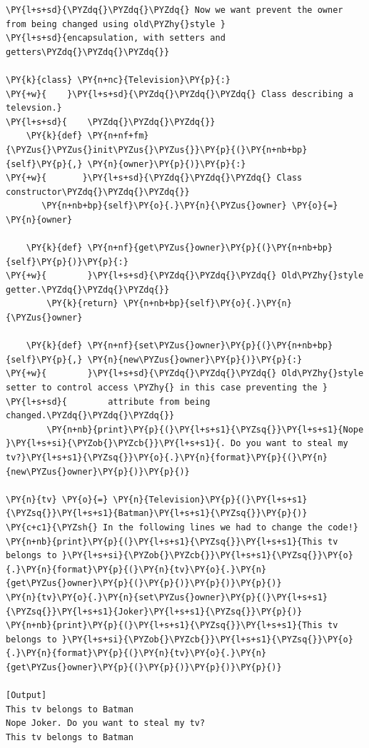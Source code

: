 \begin{Verbatim}[label=\makebox{\url{https://github.com/lucabaldini/cmepda/tree/master/slides/latex/snippets/class\_tv\_encapsulation\_old.py}},commandchars=\\\{\}]
\PY{l+s+sd}{\PYZdq{}\PYZdq{}\PYZdq{} Now we want prevent the owner from being changed using old\PYZhy{}style }
\PY{l+s+sd}{encapsulation, with setters and getters\PYZdq{}\PYZdq{}\PYZdq{}}

\PY{k}{class} \PY{n+nc}{Television}\PY{p}{:}
\PY{+w}{    }\PY{l+s+sd}{\PYZdq{}\PYZdq{}\PYZdq{} Class describing a televsion.}
\PY{l+s+sd}{    \PYZdq{}\PYZdq{}\PYZdq{}}
    \PY{k}{def} \PY{n+nf+fm}{\PYZus{}\PYZus{}init\PYZus{}\PYZus{}}\PY{p}{(}\PY{n+nb+bp}{self}\PY{p}{,} \PY{n}{owner}\PY{p}{)}\PY{p}{:}
\PY{+w}{       }\PY{l+s+sd}{\PYZdq{}\PYZdq{}\PYZdq{} Class constructor\PYZdq{}\PYZdq{}\PYZdq{}}
       \PY{n+nb+bp}{self}\PY{o}{.}\PY{n}{\PYZus{}owner} \PY{o}{=} \PY{n}{owner}
    
    \PY{k}{def} \PY{n+nf}{get\PYZus{}owner}\PY{p}{(}\PY{n+nb+bp}{self}\PY{p}{)}\PY{p}{:}
\PY{+w}{        }\PY{l+s+sd}{\PYZdq{}\PYZdq{}\PYZdq{} Old\PYZhy{}style getter.\PYZdq{}\PYZdq{}\PYZdq{}}
        \PY{k}{return} \PY{n+nb+bp}{self}\PY{o}{.}\PY{n}{\PYZus{}owner}
        
    \PY{k}{def} \PY{n+nf}{set\PYZus{}owner}\PY{p}{(}\PY{n+nb+bp}{self}\PY{p}{,} \PY{n}{new\PYZus{}owner}\PY{p}{)}\PY{p}{:}
\PY{+w}{        }\PY{l+s+sd}{\PYZdq{}\PYZdq{}\PYZdq{} Old\PYZhy{}style setter to control access \PYZhy{} in this case preventing the }
\PY{l+s+sd}{        attribute from being changed.\PYZdq{}\PYZdq{}\PYZdq{}}
        \PY{n+nb}{print}\PY{p}{(}\PY{l+s+s1}{\PYZsq{}}\PY{l+s+s1}{Nope }\PY{l+s+si}{\PYZob{}\PYZcb{}}\PY{l+s+s1}{. Do you want to steal my tv?}\PY{l+s+s1}{\PYZsq{}}\PY{o}{.}\PY{n}{format}\PY{p}{(}\PY{n}{new\PYZus{}owner}\PY{p}{)}\PY{p}{)}
    
\PY{n}{tv} \PY{o}{=} \PY{n}{Television}\PY{p}{(}\PY{l+s+s1}{\PYZsq{}}\PY{l+s+s1}{Batman}\PY{l+s+s1}{\PYZsq{}}\PY{p}{)}
\PY{c+c1}{\PYZsh{} In the following lines we had to change the code!}
\PY{n+nb}{print}\PY{p}{(}\PY{l+s+s1}{\PYZsq{}}\PY{l+s+s1}{This tv belongs to }\PY{l+s+si}{\PYZob{}\PYZcb{}}\PY{l+s+s1}{\PYZsq{}}\PY{o}{.}\PY{n}{format}\PY{p}{(}\PY{n}{tv}\PY{o}{.}\PY{n}{get\PYZus{}owner}\PY{p}{(}\PY{p}{)}\PY{p}{)}\PY{p}{)}
\PY{n}{tv}\PY{o}{.}\PY{n}{set\PYZus{}owner}\PY{p}{(}\PY{l+s+s1}{\PYZsq{}}\PY{l+s+s1}{Joker}\PY{l+s+s1}{\PYZsq{}}\PY{p}{)}
\PY{n+nb}{print}\PY{p}{(}\PY{l+s+s1}{\PYZsq{}}\PY{l+s+s1}{This tv belongs to }\PY{l+s+si}{\PYZob{}\PYZcb{}}\PY{l+s+s1}{\PYZsq{}}\PY{o}{.}\PY{n}{format}\PY{p}{(}\PY{n}{tv}\PY{o}{.}\PY{n}{get\PYZus{}owner}\PY{p}{(}\PY{p}{)}\PY{p}{)}\PY{p}{)}

[Output]
This tv belongs to Batman
Nope Joker. Do you want to steal my tv?
This tv belongs to Batman
\end{Verbatim}